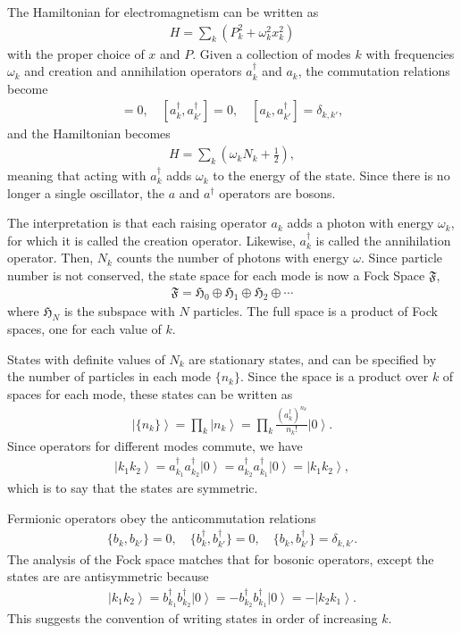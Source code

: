 \documentclass[12pt]{article} %
\renewcommand{\th}[1]{\frac{1}{#1}}
\newcommand{\om}{\omega}
\newcommand{\ket}[1]{\left|#1\right\rangle}
\begin{document}
The Hamiltonian for electromagnetism can be written as
\begin{align}
H = \sum_k \left(P_k^2 + \om_k^2x_k^2\right)
\end{align}
with the proper choice of $x$ and $P$. Given a collection of modes $k$ with frequencies $\om_k$ and creation and annihilation operators $a_k^\dag$ and $a_k$, the commutation relations become 
\begin{align}
[a_k, a_{k'}] = 0,\quad [a^\dag_k, a^\dag_{k'}]=0, \quad[a_k,a^\dag_{k'}] = 
	\delta_{k,k'},
\end{align}
and the Hamiltonian becomes
\begin{align}
H = \sum_k\left(\om_kN_k+\th{2}\right),
\end{align}
meaning that acting with $a_k^\dag$ adds $\om_k$ to the energy of the state. Since there is no longer a single oscillator, the $a$ and $a^\dag$ operators are bosons. 

The interpretation is that each raising operator $a_k$ adds a photon with energy $\om_k$, for which it is called the creation operator. Likewise, $a_k^\dag$ is called the annihilation operator. Then, $N_k$ counts the number of photons with energy $\om$. Since particle number is not conserved, the state space for each mode is now a  Fock Space $\mathfrak{F}$,
\begin{align}
\mathfrak{F} = \mathfrak{H}_0 \oplus \mathfrak{H}_1 \oplus \mathfrak{H}_2 
\oplus \cdots
\end{align}
where $\mathfrak{H}_N$ is the subspace with $N$ particles. The full space is a product of Fock spaces, one for each value of $k$.

States with definite values of $N_k$ are stationary states, and can be specified by the number of particles in each mode $\{n_k\}$. Since the space is a product over $k$ of spaces for each mode, these states can be written as
\begin{align}
\ket{\{n_k\}} = \prod_k\ket{n_k} = \prod_k\frac{(a_k^\dag)^{n_k}}{n_k!}\ket{0}.
\end{align}
Since operators for different modes commute, we have
\begin{align}
\ket{k_1k_2} = a^\dag_{k_1}a^\dag_{k_2}\ket{0} = a^\dag_{k_2} a^\dag_{k_1} \ket{0} = \ket{k_1k_2},
\end{align}
which is to say that the states are symmetric.

Fermionic operators obey the anticommutation relations
\begin{align}
\{b_k, b_{k'}\} = 0,\quad \{b^\dag_k, b^\dag_{k'}\} = 0,\quad \{b_k, b^\dag_{k'}\} = \delta_{k,k'}.
\end{align}
The analysis of the Fock space matches that for bosonic operators, except the states are are antisymmetric because
\begin{align}
\ket{k_1k_2} = b^\dag_{k_1}b^\dag_{k_2}\ket{0} = -b^\dag_{k_2}b^\dag_{k_1} 
	\ket{0} = -\ket{k_2k_1}.
\end{align}
This suggests the convention of writing states in order of increasing $k$.
\end{document}
